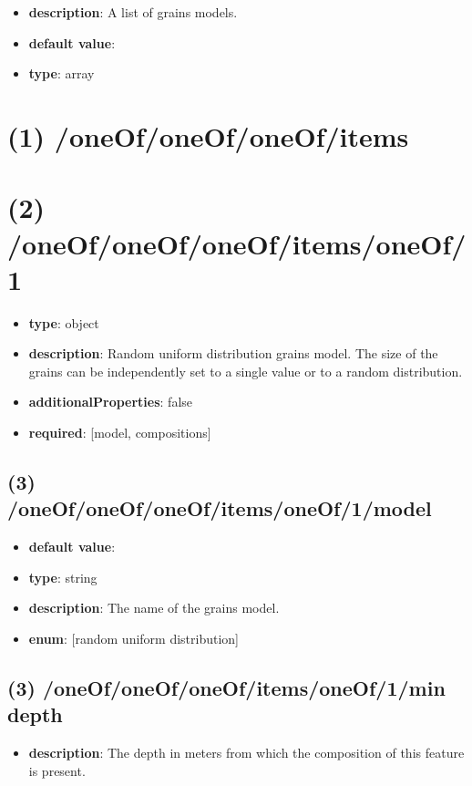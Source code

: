 \begin{itemize}[leftmargin=0em]\item {\bf description}: A list of grains models.
\item {\bf default value}: 
\item {\bf type}: array
\end{itemize}\section{(1) /oneOf/oneOf/oneOf/items}

\section{(2) /oneOf/oneOf/oneOf/items/oneOf/1}
\begin{itemize}[leftmargin=2em]\item {\bf type}: object
\item {\bf description}: Random uniform distribution grains model. The size of the grains can be independently set to a single value or to a random distribution.
\item {\bf additionalProperties}: false
\item {\bf required}: [model, compositions]\end{itemize}
\subsection{(3) /oneOf/oneOf/oneOf/items/oneOf/1/model}
\begin{itemize}[leftmargin=3em]\item {\bf default value}: 
\item {\bf type}: string
\item {\bf description}: The name of the grains model.
\item {\bf enum}: [random uniform distribution]\end{itemize}\subsection{(3) /oneOf/oneOf/oneOf/items/oneOf/1/min depth}
\begin{itemize}[leftmargin=3em]\item {\bf description}: The depth in meters from which the composition of this feature is present.
\end{itemize}
